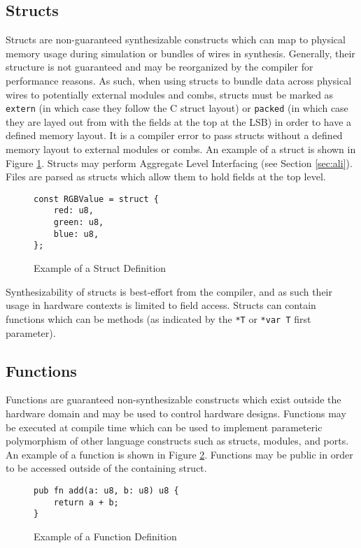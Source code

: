 \documentclass[10pt]{article}
\begin{document}
\subsection{Structs}
Structs are non-guaranteed synthesizable constructs which can map to physical memory usage during
simulation or bundles of wires in synthesis. Generally, their structure is not guaranteed and may be
reorganized by the compiler for performance reasons. As such, when using structs to bundle data
across physical wires to potentially external modules and combs, structs must be marked as
\verb|extern| (in which case they follow the C struct layout) or \verb|packed| (in which case they
are layed out from with the fields at the top at the LSB) in order to have a defined memory layout.
It is a compiler error to pass structs without a defined memory layout to external modules or combs.
An example of a struct is shown in Figure \ref{fig:struct_example}. Structs may perform Aggregate
Level Interfacing (see Section \ref{sec:ali}). Files are parsed as structs which allow them to hold
fields at the top level.
\begin{figure}[H]
	\begin{verbatim}
const RGBValue = struct {
    red: u8,
    green: u8,
    blue: u8,
};
    \end{verbatim}
	\vspace*{-10mm}
	\caption{Example of a Struct Definition}
	\label{fig:struct_example}
\end{figure}
Synthesizability of structs is best-effort from the compiler, and as such their usage in hardware
contexts is limited to field access. Structs can contain functions which can be methods (as
indicated by the \verb|*T| or \verb|*var T| first parameter).

\subsection{Functions}
Functions are guaranteed non-synthesizable constructs which exist outside the hardware domain and
may be used to control hardware designs. Functions may be executed at compile time which can be
used to implement parameteric polymorphism of other language constructs such as structs, modules,
and ports. An example of a function is shown in Figure \ref{fig:function_example}. Functions may be
public in order to be accessed outside of the containing struct.
\begin{figure}[H]
	\begin{verbatim}
pub fn add(a: u8, b: u8) u8 {
    return a + b;
}
    \end{verbatim}
	\vspace*{-10mm}
	\caption{Example of a Function Definition}
	\label{fig:function_example}
\end{figure}
\end{document}
